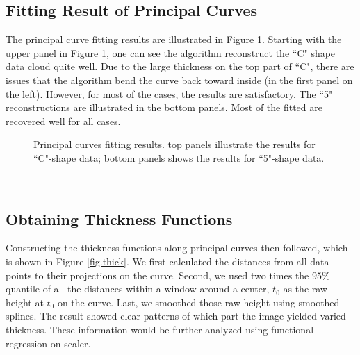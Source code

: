 \documentclass[12pt]{article}
\begin{document}
\subsection{Fitting Result of Principal Curves}
The principal curve fitting results are illustrated in Figure \ref{fig.PS}. Starting with the upper panel in Figure \ref{fig.PS}, one can see the algorithm reconstruct the ``C" shape data cloud quite well. Due to the large thickness on the top part of ``C", there are issues that the algorithm bend the curve back toward inside (in the first panel on the left). However, for most of the cases, the results are satisfactory. The ``5" reconstructions are illustrated in the bottom panels. Most of the fitted are recovered well for all cases.\

\begin{figure}[H]
\caption[Principal Curves]{\footnotesize Principal curves fitting results. top panels illustrate the results for ``C"-shape data; bottom panels shows the results for ``5"-shape data.}
\label{fig.PS}
\begin{minipage}[b]{1\linewidth}
\centering
{}
\vspace{-0.3cm}
\end{minipage}
\end{figure}\

\subsection{Obtaining Thickness Functions}
Constructing the thickness functions along principal curves then followed, which is shown in Figure \ref{fig.thick}. We first calculated the distances from all data points to their projections on the curve. Second, we used two times the $95\%$ quantile of all the distances within a window around a center, $t_0$ as the raw height at $t_0$ on the curve. Last, we smoothed those raw height using smoothed splines. The result showed clear patterns of which part the image yielded varied thickness. These information would be further analyzed using functional regression on scaler.
\end{document}
